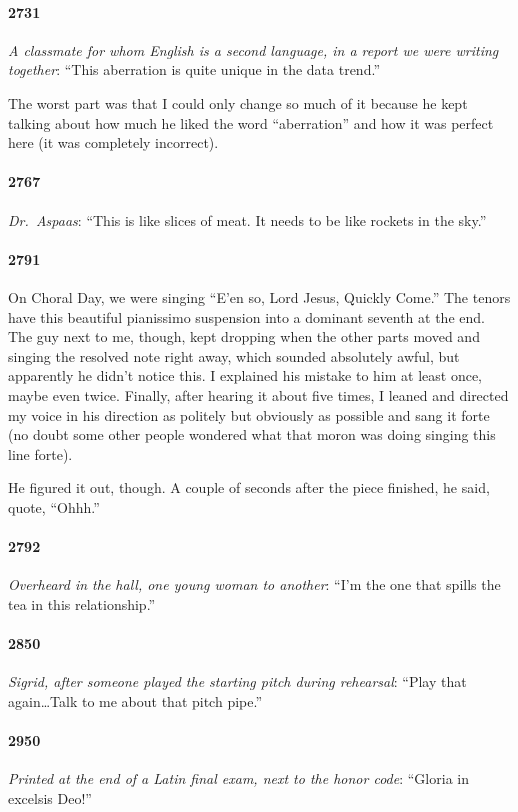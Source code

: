 \documentclass[10pt]{memoir}
\newcommand{\intro}[1]{\emph{#1}}
\begin{document}
\paragraph{2731} \intro{A classmate for whom English is a second language, in a report we were writing together}: ``This aberration is quite unique in the data trend.''

The worst part was that I could only change so much of it because he kept talking about how much he liked the word ``aberration'' and how it was perfect here (it was completely incorrect).

\paragraph{2767} \intro{Dr.\ Aspaas}: ``This is like slices of meat. It needs to be like rockets in the sky.''

\paragraph{2791}
On Choral Day, we were singing ``E'en so, Lord Jesus, Quickly Come.'' The tenors have this beautiful pianissimo suspension into a dominant seventh at the end. The guy next to me, though, kept dropping when the other parts moved and singing the resolved note right away, which sounded absolutely awful, but apparently he didn't notice this. I explained his mistake to him at least once, maybe even twice. Finally, after hearing it about five times, I leaned and directed my voice in his direction as politely but obviously as possible and sang it forte (no doubt some other people wondered what that moron was doing singing this line forte).

He figured it out, though. A couple of seconds after the piece finished, he said, quote, ``Ohhh.''

\paragraph{2792} \intro{Overheard in the hall, one young woman to another}: ``I'm the one that spills the tea in this relationship.''

\paragraph{2850} \intro{Sigrid, after someone played the starting pitch during rehearsal}: ``Play that again\ldots Talk to me about that pitch pipe.''

\paragraph{2950} \intro{Printed at the end of a Latin final exam, next to the honor code}: ``Gloria in excelsis Deo!''
\end{document}
